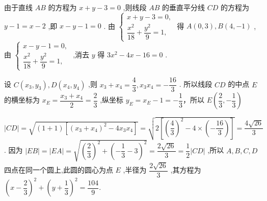 \begin{enumerate}
\begin{enumerate}
\begin{jieda}
\begin{enumerate}
                由于直线 $ {AB} $ 的方程为 $ x + y - 3 = 0 $ ,则线段 $ {AB} $ 的垂直平分线 $ {CD} $ 的方程为 $ y - 1 = x - 2 $ ,即 $ x - y - 1 = 0 $ .
                由 $ \left\{  \begin{array}{l} x + y - 3 = 0, \\  \dfrac{{x}^{2}}{18} + \dfrac{{y}^{2}}{9} = 1, \end{array}\right. $ 得 $ A\left( {0,3}\right) ,B\left( {4, - 1}\right) $ ,由 $ \left\{  \begin{array}{l} x - y - 1 = 0, \\  \dfrac{{x}^{2}}{18} + \dfrac{{y}^{2}}{9} = 1, \end{array}\right. $ ,消去 $ y $ 得 $ 3{x}^{2} - {4x} - {16} = 0 $ .
                
                设 $ C\left( {{x}_{3},{y}_{3}}\right) ,D\left( {{x}_{4},{y}_{4}}\right) $ ,则 $ {x}_{3} + {x}_{4} = \dfrac{4}{3},{x}_{3}{x}_{4} =  - \dfrac{16}{3} $ .
                所以线段 $ {CD} $ 的中点 $ E $ 的横坐标为 $ {x}_{E} = \dfrac{{x}_{3} + {x}_{4}}{2} = \dfrac{2}{3} $ ,纵坐标 $ {y}_{E} = {x}_{E} - 1 =  - \dfrac{1}{3} $，所以 $ E\left( {\dfrac{2}{3}, - \dfrac{1}{3}}\right)$
                
                $\left| {CD}\right|  = \sqrt{\left( {1 + 1}\right) \left\lbrack  {{\left( {x}_{3} + {x}_{4}\right) }^{2} - 4{x}_{3}{x}_{4}}\right\rbrack  } = \sqrt{2\left\lbrack  {{\left( \dfrac{4}{3}\right) }^{2} - 4 \times  \left( {-\dfrac{16}{3}}\right) }\right\rbrack  } = \dfrac{4\sqrt{26}}{3} $ .
                因为 $\left| {EB}\right|  = \left| {EA}\right|  = \sqrt{{\left( \dfrac{2}{3}\right) }^{2} + {\left( -\dfrac{1}{3} - 3\right) }^{2}} = \dfrac{2\sqrt{26}}{3} = \dfrac{1}{2}\left| {CD}\right|$ ,所以 $ A,B,C,D $ 四点在同一个圆上,此圆的圆心为点 $ E $ ,半径为 $ \dfrac{2\sqrt{26}}{3} $ ,其方程为
                $ {\left( x - \dfrac{2}{3}\right) }^{2} + {\left( y + \dfrac{1}{3}\right) }^{2} = \dfrac{104}{9}. $
            \end{enumerate}
        \end{jieda}
            

\end{enumerate}
\end{enumerate}
